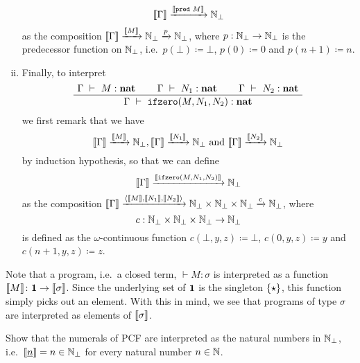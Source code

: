 \begin{definition}
\begin{enumerate}[(i)]
    \[
      \llbracket\Gamma\rrbracket \xrightarrow{\llbracket\operatorname{\mathtt{pred}}\,M\rrbracket} \mathbb N_\bot
    \]
    as the composition
    \(\llbracket\Gamma\rrbracket \xrightarrow{\llbracket M\rrbracket} \mathbb N_\bot \xrightarrow{p}
    \mathbb N_\bot\), where \(p : \mathbb N_\bot \to \mathbb N_\bot\) is the predecessor
    function on \(\mathbb N_\bot\), i.e.\ \(p(\bot) \coloneqq \bot\),
    \(p(0) \coloneqq 0\) and \(p(n+1) \coloneqq n\).
  \item\label{def:interpretation-ifzero}
    Finally, to interpret
    \[
      \def\fCenter{\ \vdash\ }
      \Axiom$\Gamma \fCenter M : \pcfnat$
      \Axiom$\Gamma \fCenter N_1 : \pcfnat$
      \Axiom$\Gamma \fCenter N_2 : \pcfnat$
      \TrinaryInf$\Gamma \fCenter \pcfifz(M,N_1,N_2) : \pcfnat$
      \DisplayProof
    \]
    we first remark that we have
    \[
      \llbracket\Gamma\rrbracket \xrightarrow{\llbracket M\rrbracket} \mathbb N_\bot,
      \llbracket\Gamma\rrbracket \xrightarrow{\llbracket N_1\rrbracket} \mathbb N_\bot \text{ and }
      \llbracket\Gamma\rrbracket \xrightarrow{\llbracket N_2\rrbracket} \mathbb N_\bot
    \]
    by induction hypothesis, so that we can define
    \[
      \llbracket\Gamma\rrbracket \xrightarrow{\llbracket\operatorname{\mathtt{ifzero}}(M,N_1,N_2)\rrbracket} \mathbb N_\bot
    \]
    as the composition
    \(\llbracket\Gamma\rrbracket
    \xrightarrow{\langle{\llbracket M\rrbracket,\llbracket N_1\rrbracket,\llbracket N_2\rrbracket}\rangle}
    {{\mathbb N_\bot} \times {\mathbb N_\bot} \times {\mathbb N_\bot}} \xrightarrow{c}
    \mathbb N_\bot\), where
    \[
      c : \mathbb N_\bot \times \mathbb N_\bot \times \mathbb N_\bot \to \mathbb N_\bot
    \] is defined as the \(\omega\)-continuous function
    \(c(\bot,y,z) \coloneqq \bot\), \(c(0,y,z) \coloneqq y\) and
    \(c(n+1,y,z) \coloneqq z\). \qedhere
  \end{enumerate}
\end{definition}

\begin{remark}
  Note that a program, i.e.\ a closed term, \({} \vdash M : \sigma\) is
  interpreted as a function
  \(\llbracket M\rrbracket \colon \mathbf 1 \to \llbracket\sigma\rrbracket\).
  Since the underlying set of \(\mathbf 1\) is the singleton \(\{\star\}\), this
  function simply picks out an element. %
  With this in mind, we see that programs of type \(\sigma\) are interpreted
  as elements of \(\llbracket\sigma\rrbracket\).
\end{remark}


\begin{exercise}\label{exer:interpretation-of-numerals}
  Show that the numerals of PCF are interpreted as the natural numbers in
  \(\mathbb N_\bot\), i.e.\ \(\llbracket\underline{n}\rrbracket = n \in \mathbb N_\bot\) for every
  natural number \(n \in \mathbb N\).
\end{exercise}


